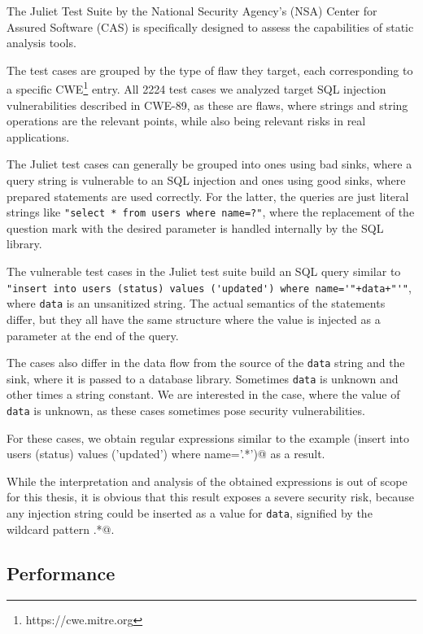 The Juliet Test Suite by the National Security Agency’s (NSA) Center for Assured Software (CAS) is specifically designed to assess the capabilities of static analysis tools.

The test cases are grouped by the type of flaw they target, each corresponding to a specific CWE\footnote{https://cwe.mitre.org} entry. All 2224 test cases we analyzed target SQL injection vulnerabilities described in CWE-89, as these are flaws, where strings and string operations are the relevant points, while also being relevant risks in real applications.

The Juliet test cases can generally be grouped into ones using bad sinks, where a query string is vulnerable to an SQL injection and ones using good sinks, where prepared statements are used correctly. For the latter, the queries are just literal strings like \lstinline|"select * from users where name=?"|, where the replacement of the question mark with the desired parameter is handled internally by the SQL library.

The vulnerable test cases in the Juliet test suite build an SQL query similar to \lstinline|"insert into users (status) values ('updated') where name='"+data+"'"|, where \lstinline|data| is an unsanitized string. The actual semantics of the statements differ, but they all have the same structure where the value is injected as a parameter at the end of the query.

The cases also differ in the data flow from the source of the \lstinline|data| string and the sink, where it is passed to a database library. Sometimes \lstinline|data| is unknown and other times a string constant. We are interested in the case, where the value of \lstinline|data| is unknown, as these cases sometimes pose security vulnerabilities.

For these cases, we obtain regular expressions similar to the example \Verb@(insert into users (status) values ('updated') where name='.*')@ as a result.

While the interpretation and analysis of the obtained expressions is out of scope for this thesis, it is obvious that this result exposes a severe security risk, because any injection string could be inserted as a value for \lstinline|data|, signified by the wildcard pattern \Verb@.*@.

\subsection{Performance}\label{sec:eval:peformance}

